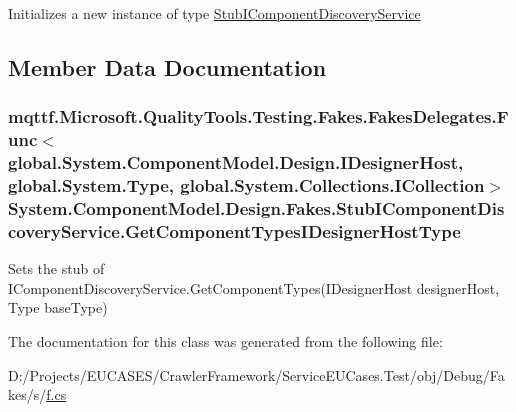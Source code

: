 Initializes a new instance of type \hyperlink{class_system_1_1_component_model_1_1_design_1_1_fakes_1_1_stub_i_component_discovery_service}{Stub\-I\-Component\-Discovery\-Service}



\subsection{Member Data Documentation}
\hypertarget{class_system_1_1_component_model_1_1_design_1_1_fakes_1_1_stub_i_component_discovery_service_a6376a5cef9c0698b8e049c48bc82d49a}{
\subsubsection[{Get\-Component\-Types\-I\-Designer\-Host\-Type}]{\setlength{\rightskip}{0pt plus 5cm}mqttf.\-Microsoft.\-Quality\-Tools.\-Testing.\-Fakes.\-Fakes\-Delegates.\-Func$<$global.\-System.\-Component\-Model.\-Design.\-I\-Designer\-Host, global.\-System.\-Type, global.\-System.\-Collections.\-I\-Collection$>$ System.\-Component\-Model.\-Design.\-Fakes.\-Stub\-I\-Component\-Discovery\-Service.\-Get\-Component\-Types\-I\-Designer\-Host\-Type}}\label{class_system_1_1_component_model_1_1_design_1_1_fakes_1_1_stub_i_component_discovery_service_a6376a5cef9c0698b8e049c48bc82d49a}


Sets the stub of I\-Component\-Discovery\-Service.\-Get\-Component\-Types(\-I\-Designer\-Host designer\-Host, Type base\-Type)



The documentation for this class was generated from the following file\-:\begin{DoxyCompactItemize}
\item 
D\-:/\-Projects/\-E\-U\-C\-A\-S\-E\-S/\-Crawler\-Framework/\-Service\-E\-U\-Cases.\-Test/obj/\-Debug/\-Fakes/s/\hyperlink{s_2f_8cs}{f.\-cs}\end{DoxyCompactItemize}
